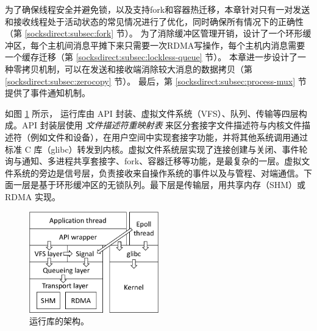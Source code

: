 为了确保线程安全并避免锁，以及支持fork和容器热迁移，本章针对只有一对发送和接收线程处于活动状态的常见情况进行了优化，同时确保所有情况下的正确性（第 \ref {socksdirect:subsec:fork} 节）。
为了消除缓冲区管理开销，设计了一个环形缓冲区，每个主机间消息平摊下来只需要一次RDMA写操作，每个主机内消息需要一个缓存迁移（第 \ref {socksdirect:subsec:lockless-queue}  节）。
本章进一步设计了一种零拷贝机制，可以在发送和接收端消除较大消息的数据拷贝（第 \ref {socksdirect:subsec:zerocopy} 节）。
最后，第 \ref {socksdirect:subsec:process-mux} 节提供了事件通知机制。


如图 \ref{socksdirect:fig:libsd-architecture} 所示，\libipc{} 运行库由 API 封装、虚拟文件系统（VFS）、队列、传输等四层构成。API 封装层使用 \emph {文件描述符重映射表} 来区分套接字文件描述符与内核文件描述符（例如文件和设备），在用户空间中实现套接字功能，并将其他系统调用通过标准 C 库（glibc）转发到内核。虚拟文件系统层实现了连接创建与关闭、事件轮询与通知、多进程共享套接字、fork、容器迁移等功能，是最复杂的一层。虚拟文件系统的旁边是信号层，负责接收来自操作系统的事件以及与管程、对端通信。下面一层是基于环形缓冲区的无锁队列。最下层是传输层，用共享内存（SHM）或 RDMA 实现。

\begin{figure}[htbp]
	\centering
	\includegraphics[width=0.5\textwidth]{images/libsd_architecture}
	\caption{\libipc{} 运行库的架构。}
	\label{socksdirect:fig:libsd-architecture}
\end{figure}



